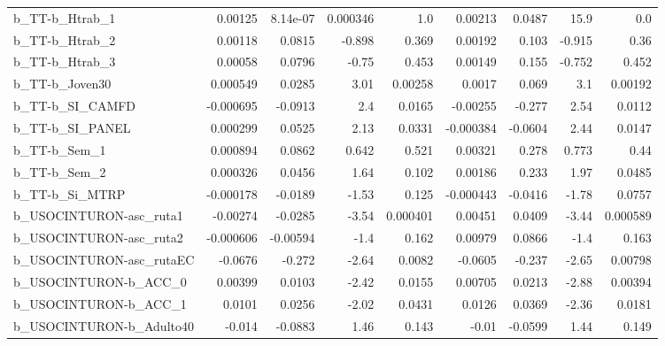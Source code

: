 \begin{tabular}{lrrrrrrrr}
b\_TT-b\_Htrab\_1             &     0.00125 &     8.14e-07 &  0.000346 &      1.0 &    0.00213 &      0.0487 &         15.9 &           0.0 \\
b\_TT-b\_Htrab\_2             &     0.00118 &       0.0815 &    -0.898 &    0.369 &    0.00192 &       0.103 &       -0.915 &          0.36 \\
b\_TT-b\_Htrab\_3             &     0.00058 &       0.0796 &     -0.75 &    0.453 &    0.00149 &       0.155 &       -0.752 &         0.452 \\
b\_TT-b\_Joven30             &    0.000549 &       0.0285 &      3.01 &  0.00258 &     0.0017 &       0.069 &          3.1 &       0.00192 \\
b\_TT-b\_SI\_CAMFD            &   -0.000695 &      -0.0913 &       2.4 &   0.0165 &   -0.00255 &      -0.277 &         2.54 &        0.0112 \\
b\_TT-b\_SI\_PANEL            &    0.000299 &       0.0525 &      2.13 &   0.0331 &  -0.000384 &     -0.0604 &         2.44 &        0.0147 \\
b\_TT-b\_Sem\_1               &    0.000894 &       0.0862 &     0.642 &    0.521 &    0.00321 &       0.278 &        0.773 &          0.44 \\
b\_TT-b\_Sem\_2               &    0.000326 &       0.0456 &      1.64 &    0.102 &    0.00186 &       0.233 &         1.97 &        0.0485 \\
b\_TT-b\_Si\_MTRP             &   -0.000178 &      -0.0189 &     -1.53 &    0.125 &  -0.000443 &     -0.0416 &        -1.78 &        0.0757 \\
b\_USOCINTURON-asc\_ruta1    &    -0.00274 &      -0.0285 &     -3.54 & 0.000401 &    0.00451 &      0.0409 &        -3.44 &      0.000589 \\
b\_USOCINTURON-asc\_ruta2    &   -0.000606 &     -0.00594 &      -1.4 &    0.162 &    0.00979 &      0.0866 &         -1.4 &         0.163 \\
b\_USOCINTURON-asc\_rutaEC   &     -0.0676 &       -0.272 &     -2.64 &   0.0082 &    -0.0605 &      -0.237 &        -2.65 &       0.00798 \\
b\_USOCINTURON-b\_ACC\_0      &     0.00399 &       0.0103 &     -2.42 &   0.0155 &    0.00705 &      0.0213 &        -2.88 &       0.00394 \\
b\_USOCINTURON-b\_ACC\_1      &      0.0101 &       0.0256 &     -2.02 &   0.0431 &     0.0126 &      0.0369 &        -2.36 &        0.0181 \\
b\_USOCINTURON-b\_Adulto40   &      -0.014 &      -0.0883 &      1.46 &    0.143 &      -0.01 &     -0.0599 &         1.44 &         0.149 \\

\end{tabular}
